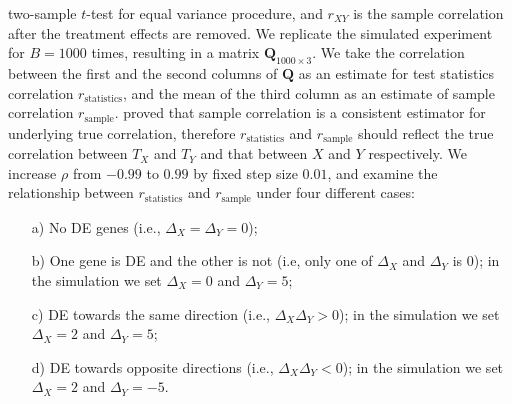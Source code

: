 \documentclass[12pt, a4paper]{article}
\begin{document}
	two-sample $t$-test for equal variance procedure, and $r_{XY}$ is the sample correlation after 
	the treatment effects  are removed. We replicate the simulated
	experiment for $B=1000$ times, resulting in a matrix $\bm Q_{1000\times 3}$. We take the correlation between the first and the second columns of $\bm Q$ as an estimate for test statistics correlation	$r_\text{statistics}$, and 
	the mean of the third column as an estimate of sample correlation $r_{\text{sample}}$. 
	\citet{fisher1915frequency} proved that sample correlation is a consistent estimator for underlying true 
	correlation, therefore
		$r_\text{statistics}$ and $r_{\text{sample}}$ should reflect the true correlation between $T_X$ and $T_Y$ and 
		that between $X$ and $Y$ respectively. 
		We increase $\rho$ from $-0.99$ to $0.99$ by fixed step size $0.01$, and examine the relationship between $r_\text{statistics}$ and $r_{\text{sample}}$ under four different cases:
	\begin{enumerate}
		\item[a)] No DE genes (i.e., $\Delta_X = \Delta_Y  =0$);
		\item[b)] One gene is DE and the other is not (i.e, only one of $\Delta_X$ and $\Delta_Y$ is 0); in the simulation we set $\Delta_X = 0$ and $\Delta_Y=5$;
		\item[c)] DE towards the same direction (i.e., $\Delta_X\Delta_Y>0$); in the simulation we set $\Delta_X = 2$ and $\Delta_Y=5$;
		\item[d)] DE towards opposite directions (i.e., $\Delta_X\Delta_Y <0$); in the simulation we set $\Delta_X = 2$ and $\Delta_Y=-5$.
		\end{enumerate}
		
\end{document}
